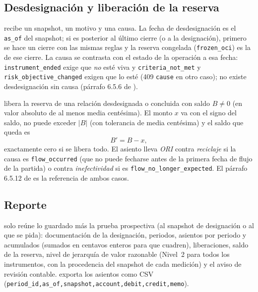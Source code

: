 \subsection{Desdesignación y liberación de la reserva}\label{sec:cap10-desdesignacion}

 recibe un snapshot, un motivo y una causa. La fecha de desdesignación es
el \texttt{as\_of} del snapshot; si es posterior al último cierre (o a la designación), primero se hace un cierre con
las mismas reglas y la reserva congelada (\texttt{frozen\_oci}) es la de ese cierre. La causa se contrasta con el estado
de la operación a esa fecha: \texttt{instrument\_ended} exige que \emph{no} esté viva y \texttt{criteria\_not\_met} y
\texttt{risk\_objective\_changed} exigen que lo esté (409 \texttt{cause} en otro caso); no existe desdesignación sin
causa (párrafo 6.5.6 de \citealp{iasb2014}).

 libera la reserva de una relación desdesignada o concluida con saldo
$B\neq 0$ (en valor absoluto de al menos media centésima). El monto $x$ va con el signo del saldo, no puede exceder $|B|$ (con
tolerancia de media centésima) y el saldo que queda es
\begin{equation}\label{eq:cap10-liberacion}
  B' = B - x ,
\end{equation}
exactamente cero si se libera todo. El asiento lleva \emph{ORI} contra \emph{reciclaje} si la causa es
\texttt{flow\_occurred} (que no puede fecharse antes de la primera fecha de flujo de la partida) o contra
\emph{inefectividad} si es \texttt{flow\_no\_longer\_expected}. El párrafo 6.5.12 de \citet{iasb2014} es la referencia de ambos casos.

\subsection{Reporte}\label{sec:cap10-reporte}

 solo reúne lo guardado más la prueba prospectiva (al snapshot de
designación o al que se pida): documentación de la designación, periodos, asientos por periodo y acumulados
(sumados en centavos enteros para que cuadren), liberaciones, saldo de la reserva, nivel de jerarquía de valor
razonable (Nivel~2 para todos los instrumentos, con la procedencia del snapshot de cada medición) y el aviso de revisión
contable.  exporta los asientos como CSV
(\texttt{period\_id,as\_of,snapshot,account,debit,credit,memo}).

